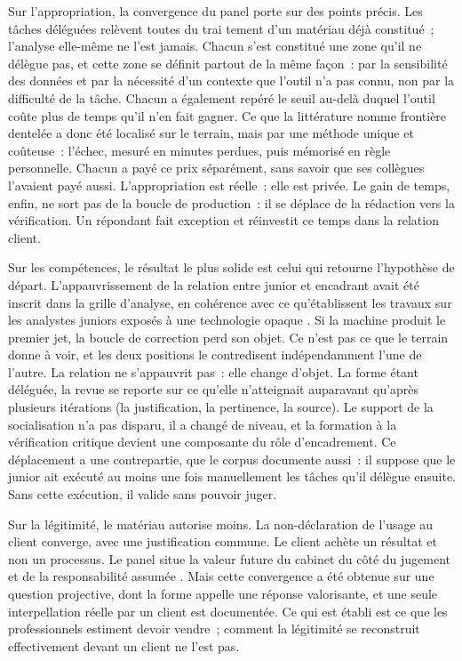 Sur l'appropriation, la convergence du panel porte sur des points précis. Les tâches
déléguées relèvent toutes du trai   tement d'un matériau déjà constitué~; l'analyse elle-même ne
l'est jamais. Chacun s'est constitué une zone qu'il ne délègue pas, et cette zone se définit
partout de la même façon~: par la sensibilité des données et par la nécessité d'un contexte
que l'outil n'a pas connu, non par la difficulté de la tâche. Chacun a également repéré le
seuil au-delà duquel l'outil coûte plus de temps qu'il n'en fait gagner. Ce que la
littérature nomme frontière dentelée \cite{dellacqua2026} a donc été localisé sur le terrain,
mais par une méthode unique et coûteuse~: l'échec, mesuré en minutes perdues, puis mémorisé
en règle personnelle. Chacun a payé ce prix séparément, sans savoir que ses collègues
l'avaient payé aussi. L'appropriation est réelle~; elle est privée. Le gain de temps, enfin,
ne sort pas de la boucle de production~: il se déplace de la rédaction vers la vérification.
Un répondant fait exception et réinvestit ce temps dans la relation client.

Sur les compétences, le résultat le plus solide est celui qui retourne l'hypothèse de départ.
L'appauvrissement de la relation entre junior et encadrant avait été inscrit dans la grille
d'analyse, en cohérence avec ce qu'établissent les travaux sur les analystes juniors exposés
à une technologie opaque \cite{anthony2021}. Si la machine produit le premier jet, la boucle
de correction perd son objet. Ce n'est pas ce que le terrain donne à voir, et les deux
positions le contredisent indépendamment l'une de l'autre. La relation ne s'appauvrit pas~:
elle change d'objet. La forme étant déléguée, la revue se reporte sur ce qu'elle n'atteignait
auparavant qu'après plusieurs itérations (la justification, la pertinence, la source). Le
support de la socialisation \cite{nonaka1997} n'a pas disparu, il a changé de niveau, et la
formation à la vérification critique devient une composante du rôle d'encadrement. Ce
déplacement a une contrepartie, que le corpus documente aussi~: il suppose que le junior ait
exécuté au moins une fois manuellement les tâches qu'il délègue ensuite. Sans cette
exécution, il valide sans pouvoir juger.

Sur la légitimité, le matériau autorise moins. La non-déclaration de l'usage au client
converge, avec une justification commune. Le client achète un résultat et non un
processus. Le panel situe la valeur future du cabinet du côté du jugement et de la
responsabilité assumée \cite{suchman1995}. Mais cette convergence a été obtenue sur
une question projective, dont la forme appelle une réponse valorisante, et une seule
interpellation réelle par un client est documentée. Ce qui est établi est ce que les
professionnels estiment devoir vendre~; comment la légitimité se reconstruit effectivement
devant un client ne l'est pas.

